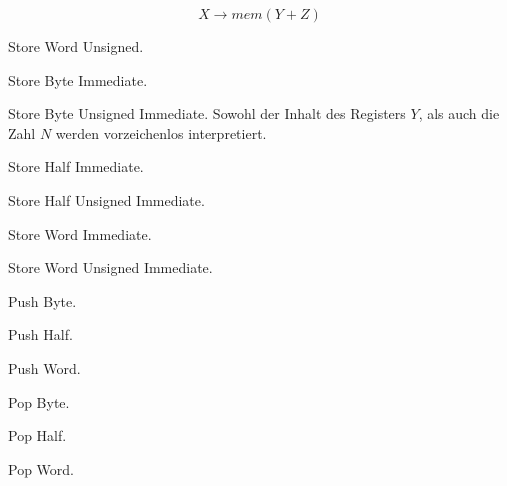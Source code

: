 \[
    X \to mem(Y + Z)
\]


\glqq Store Word Unsigned\grqq.



\glqq Store Byte Immediate\grqq.



\glqq Store Byte Unsigned Immediate\grqq.
Sowohl der Inhalt des Registers $Y$, als auch die Zahl $N$ werden 
vorzeichenlos interpretiert.



\glqq Store Half Immediate\grqq.



\glqq Store Half Unsigned Immediate\grqq.



\glqq Store Word Immediate\grqq.



\glqq Store Word Unsigned Immediate\grqq.



\glqq Push Byte\grqq.



\glqq Push Half\grqq.



\glqq Push Word\grqq.



\glqq Pop Byte\grqq.


\glqq Pop Half\grqq.



\glqq Pop Word\grqq.


